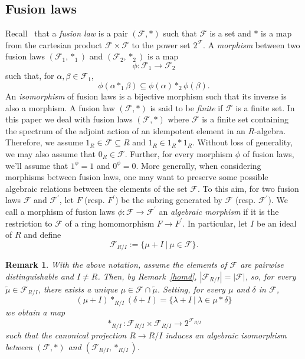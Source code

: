 \documentclass[a4paper]{amsart}
\newtheorem{remark}[lemma]{Remark}
\begin{document}
\subsection{Fusion laws}
Recall~\cite{DSV} that a {\it fusion law} is a pair $(\mathcal F, \ast)$ such that $\mathcal F$ is a set and $\ast$ is a map from the cartesian product ${\mathcal F}\times {\mathcal F}$ to the power set $2^{\mathcal F}$. 
A {\it morphism} between  two fusion laws 
$(\mathcal F_{1}, \ast_1)$ and $(\mathcal F_{2}, \ast_2)$ is a map 
$$
\phi\colon {\mathcal F_{1}} \to {\mathcal F_{2}}
$$ 
such that, for $\alpha,\beta\in {\mathcal F_{1}}$, 
$$
\phi(\alpha\ast_1 \beta)\subseteq \phi(\alpha) \ast_2\phi(\beta).
$$
An {\it isomorphism} of fusion laws is a bijective morphism such that its inverse is also a morphism. 
A  fusion law $(\mathcal F, \ast)$ is said to be {\it finite} if ${\mathcal F}$ is a finite set.  In this paper we deal with fusion laws $(\mathcal F, \ast)$ where $\mathcal F$ is a  finite set containing the spectrum of the adjoint action of an idempotent element in an $R$-algebra. Therefore, we assume $1_R\in \mathcal F\subseteq R$ and $1_R\in 1_R\ast 1_R$.  Without loss of generality, we may also assume that  $0_R\in \mathcal F$.  Further, for every morphism $\phi$ of fusion laws, we'll assume that $1^\phi=1$ and $0^\phi=0$.  More generally, when considering morphisms between fusion laws, one may want to preserve some possible algebraic relations between the elements of the set $\mathcal F$. To this aim, for two fusion laws $\mathcal F$ and $\mathcal F^\prime$, let $F$ (resp. $F^\prime$) be the subring generated by $\mathcal F$ (resp. $\mathcal F^\prime$). We call a morphism of fusion laws $\phi\colon \mathcal F\to \mathcal F^\prime$ an {\it algebraic morphism} if it is the restriction to $\mathcal F$ of a ring homomorphism $F \to F^\prime$.  
In particular, let $I$ be an ideal of $R$ and define
\begin{equation}\label{quotientfusion}
\mathcal F_{R/I}:=\{ \mu+I\:|\: \mu\in \mathcal F\}.
\end{equation}

\begin{remark}\label{mor}
With the above notation, assume the elements of $\mathcal F$ are pairwise distinguishable and $I\neq R$. Then, by Remark~\ref{homd}, $|\mathcal F_{R/I}|=|\mathcal F|$, so, for every $\tilde{\mu}\in \mathcal F_{R/I}$, there exists a unique $\mu\in \mathcal F\cap \tilde{\mu}$. Setting, 
for every $\mu$ and $\delta$ in $\mathcal F$, 
$$
(\mu+I) \ast_{R/I} ( \delta+I)= \{ \lambda+I\:|\:\lambda \in \mu\ast \delta \}
$$
we obtain a map
\begin{equation}\label{asti}
\ast_{R/I} :\mathcal F_{R/I} \times \mathcal F_{R/I} \to 2^{\mathcal F_{R/I}}
\end{equation}
such that  the canonical projection $R\to R/I$ induces an algebraic isomorphism between $ (\mathcal F, \ast)$ and $({\mathcal F}_{R/I}, \ast_{R/I} )$.
\end{remark}
\end{document}
